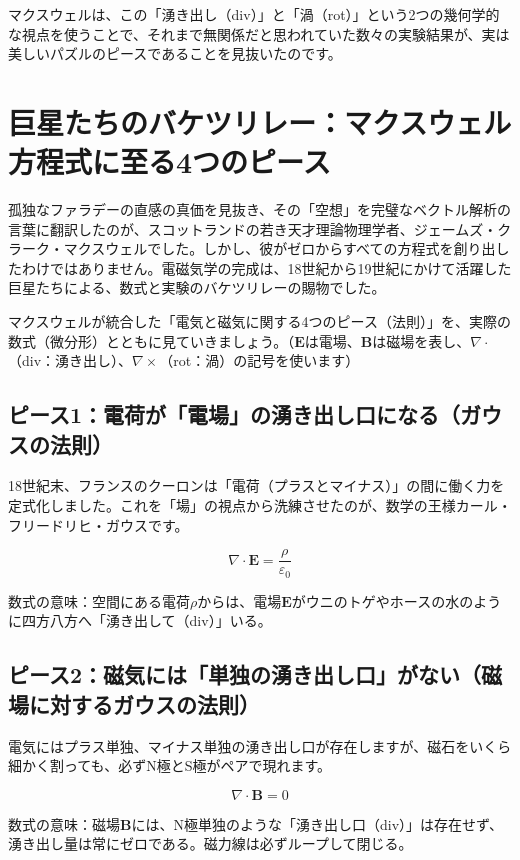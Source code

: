マクスウェルは、この「湧き出し（div）」と「渦（rot）」という2つの幾何学的な視点を使うことで、それまで無関係だと思われていた数々の実験結果が、実は美しいパズルのピースであることを見抜いたのです。

\section{巨星たちのバケツリレー：マクスウェル方程式に至る4つのピース}

孤独なファラデーの直感の真価を見抜き、その「空想」を完璧なベクトル解析の言葉に翻訳したのが、スコットランドの若き天才理論物理学者、ジェームズ・クラーク・マクスウェルでした。しかし、彼がゼロからすべての方程式を創り出したわけではありません。電磁気学の完成は、18世紀から19世紀にかけて活躍した巨星たちによる、数式と実験のバケツリレーの賜物でした。

マクスウェルが統合した「電気と磁気に関する4つのピース（法則）」を、実際の数式（微分形）とともに見ていきましょう。（\(\mathbf{E}\)は電場、\(\mathbf{B}\)は磁場を表し、\(\nabla\cdot\)（div：湧き出し）、\(\nabla\times\)（rot：渦）の記号を使います）

\subsection{ピース1：電荷が「電場」の湧き出し口になる（ガウスの法則）}

18世紀末、フランスのクーロンは「電荷（プラスとマイナス）」の間に働く力を定式化しました。これを「場」の視点から洗練させたのが、数学の王様カール・フリードリヒ・ガウスです。

\[
\nabla\cdot\mathbf{E}=\frac{\rho}{\varepsilon_0}
\]

数式の意味：空間にある電荷\(\rho\)からは、電場\(\mathbf{E}\)がウニのトゲやホースの水のように四方八方へ「湧き出して（div）」いる。

\subsection{ピース2：磁気には「単独の湧き出し口」がない（磁場に対するガウスの法則）}

電気にはプラス単独、マイナス単独の湧き出し口が存在しますが、磁石をいくら細かく割っても、必ずN極とS極がペアで現れます。

\[
\nabla\cdot\mathbf{B}=0
\]

数式の意味：磁場\(\mathbf{B}\)には、N極単独のような「湧き出し口（div）」は存在せず、湧き出し量は常にゼロである。磁力線は必ずループして閉じる。

